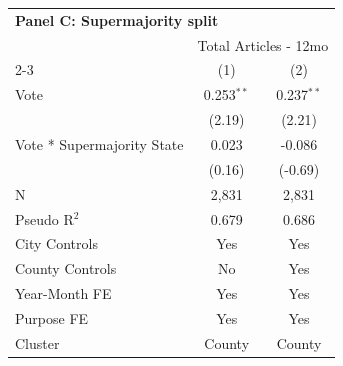 \begingroup
\centering
\begin{tabular*}{\textwidth}{@{\extracolsep{\fill}}lcc}
\multicolumn{5}{l}{\textbf{Panel C: Supermajority split}}\\

\addlinespace
   \toprule
    & \multicolumn{2}{c}{Total Articles - 12mo}\\
   \cmidrule(lr){2-3}
                              & (1)          & (2)\\  
   \midrule 
   Vote                       & 0.253$^{**}$ & 0.237$^{**}$\\   
                              & (2.19)       & (2.21)\\   
   Vote * Supermajority State & 0.023        & -0.086\\   
                              & (0.16)      & (-0.69)\\   
   \hline
   N               & 2,831        & 2,831\\  
   Pseudo R$^2$               & 0.679        & 0.686\\  
   City Controls              & Yes           & Yes\\
   County Controls            & No            & Yes\\
   Year-Month FE              & Yes          & Yes\\  
   Purpose FE                 & Yes          & Yes\\  
   Cluster              & County & County\\  
   \bottomrule
\end{tabular*}
\par\endgroup
